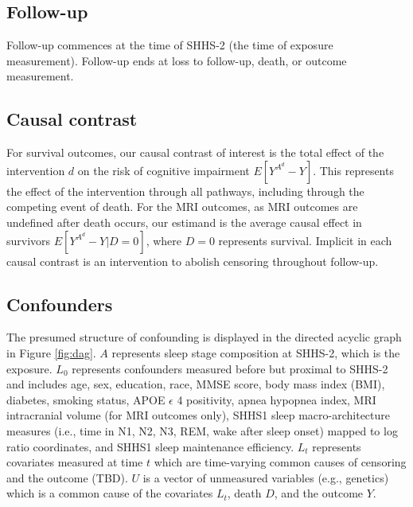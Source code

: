 \documentclass{article}
\begin{document}
\subsection{Follow-up}
Follow-up commences at the time of SHHS-2 (the time of exposure measurement). Follow-up ends at loss to follow-up, death, or outcome measurement.

\subsection{Causal contrast}

For survival outcomes, our causal contrast of interest is the total effect \cite{youngCausalFrameworkClassical2020b} of the intervention $d$ on the risk of cognitive impairment $E[Y^{A^d} - Y]$. This represents the effect of the intervention through all pathways, including through the competing event of death. For the MRI outcomes, as MRI outcomes are undefined after death occurs, our estimand is the average causal effect in survivors $E[Y^{A^d} - Y|D=0]$, where $D=0$ represents survival. Implicit in each causal contrast is an intervention to abolish censoring throughout follow-up.


\subsection{Confounders}

The presumed structure of confounding is displayed in the directed acyclic graph in Figure \ref{fig:dag}. $A$ represents sleep stage composition at SHHS-2, which is the exposure. $L_0$ represents confounders measured before but proximal to SHHS-2 and includes age, sex, education, race, MMSE score, body mass index (BMI), diabetes, smoking status, APOE $\epsilon$ 4 positivity, apnea hypopnea index, MRI intracranial volume (for MRI outcomes only), SHHS1 sleep macro-architecture measures (i.e., time in N1, N2, N3, REM, wake after sleep onset) mapped to log ratio coordinates, and SHHS1 sleep maintenance efficiency. $L_t$ represents covariates measured at time $t$ which are time-varying common causes of censoring and the outcome (TBD). $U$ is a vector of unmeasured variables (e.g., genetics) which is a common cause of the covariates $L_t$, death $D$, and the outcome $Y$.
\end{document}
